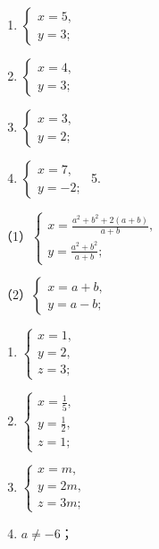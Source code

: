 \begin{enumerate}[start=1]
\item
  \(\left\{ \begin{array}{l} x = 5, \\ y = 3; \end{array} \right.\)
\item
  \(\left\{ \begin{array}{l} x = 4, \\ y = 3; \end{array} \right.\)
\item
  \(\left\{ \begin{array}{l} x = 3, \\ y = 2; \end{array} \right.\)
\item
  \(\left\{ \begin{array}{l} x = 7, \\ y = -2; \end{array} \right.\) 5.
\end{enumerate}
（1）\(\left\{ \begin{array}{l} x = \frac{a^2 + b^2 + 2(a + b)}{a + b}, \\ y = \frac{a^2 + b^2}{a + b}; \end{array} \right.\)

（2）\(\left\{ \begin{array}{l} x = a + b, \\ y = a - b; \end{array} \right.\)
\begin{enumerate}[start=6]
\item
  \(\left\{ \begin{array}{l} x = 1, \\ y = 2, \\ z = 3; \end{array} \right.\)
\item
  \(\left\{ \begin{array}{l} x = \frac{1}{5}, \\ y = \frac{1}{2}, \\ z = 1; \end{array} \right.\)
\item
  \(\left\{ \begin{array}{l} x = m, \\ y = 2m, \\ z = 3m; \end{array} \right.\)
\item
  \(a \neq -6\)；
\end{enumerate}

